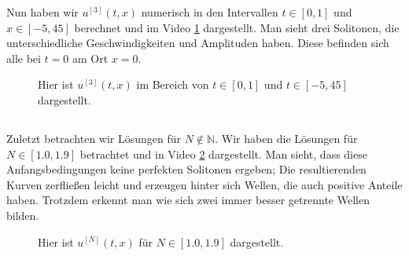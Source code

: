 \documentclass[ngerman]{scrartcl}
\begin{document}
Nun haben wir $u^{[3]}(t, x)$ numerisch in den Intervallen $t \in[0,1]$ und $x\in[-5,45]$ berechnet und im Video \ref{vid:H10.3} dargestellt. 
Man sieht drei Solitonen, die unterschiedliche Geschwindigkeiten und Amplituden haben.
Diese befinden sich alle bei $t=0$ am Ort $x=0$.

\begin{figure}[htbp]
	\centering
	\caption[]{Hier ist $u^{[3]}(t, x)$ im Bereich von $t\in[0,1]$ und $t\in[-5,45]$ dargestellt.}
	\label{vid:H10.3}
\end{figure}
\subsection{}
Zuletzt betrachten wir Lösungen für $N\notin\mathbb{N}$.
Wir haben die Lösungen für $N\in[1.0,1.9]$ betrachtet und in Video \ref{vid:H10.4} dargestellt.
Man sieht, dass diese Anfangsbedingungen keine perfekten Solitonen ergeben;
Die resultierenden Kurven zerfließen leicht und erzeugen hinter sich Wellen, die auch positive Anteile haben.
Trotzdem erkennt man wie sich zwei immer besser getrennte Wellen bilden.

\begin{figure}[htbp]
	\centering
	\caption[]{Hier ist $u^{[N]}(t, x)$ für $N\in[1.0,1.9]$ dargestellt.}
	\label{vid:H10.4}
\end{figure}
\end{document}
